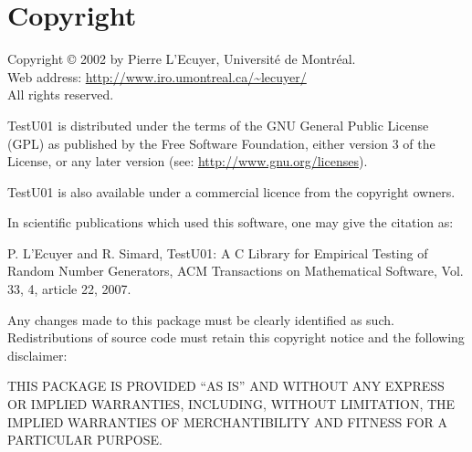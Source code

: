 \section*{Copyright}

  Copyright \copyright {} 2002 by Pierre L'Ecuyer,
    Universit\'e de Montr\'eal.\\
  Web address:   \url{http://www.iro.umontreal.ca/~lecuyer/} \\
  All rights reserved.

\noindent  TestU01 is distributed under the terms of the GNU General Public
  License (GPL) as published by the Free Software Foundation, either version 3
  of the License, or any later version (see: \url{http://www.gnu.org/licenses}).

\noindent  TestU01 is also available under a commercial licence from the
  copyright owners.

\noindent  In scientific publications which used this software, one may give the
  citation as:

\noindent  P. L'Ecuyer and R. Simard, TestU01: A C Library for Empirical Testing
  of Random Number Generators, ACM Transactions on Mathematical Software,
  Vol. 33, 4, article 22, 2007.

\noindent  Any changes made to this package must be clearly identified as such.
  Redistributions of source code must retain this copyright notice and the
  following disclaimer:

\noindent  THIS PACKAGE IS PROVIDED ``AS IS'' AND WITHOUT ANY EXPRESS OR IMPLIED
  WARRANTIES, INCLUDING, WITHOUT LIMITATION, THE IMPLIED WARRANTIES OF
  MERCHANTIBILITY AND FITNESS FOR A PARTICULAR PURPOSE.
